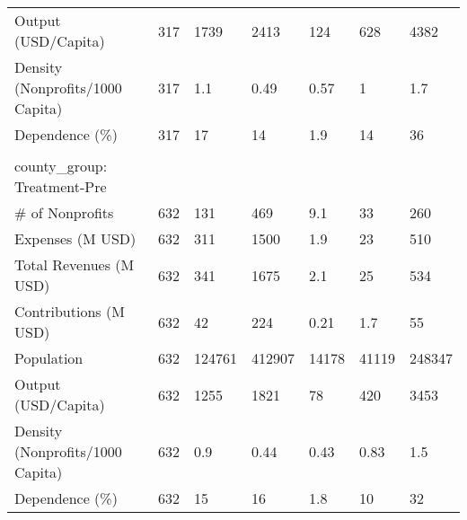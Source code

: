 \begin{tabular}{lllllll}
Output (USD/Capita) & 317 & 1739 & 2413 & 124 & 628 & 4382\\
Density (Nonprofits/1000 Capita) & 317 & 1.1 & 0.49 & 0.57 & 1 & 1.7\\
Dependence (\%) & 317 & 17 & 14 & 1.9 & 14 & 36\\
 &  &  &  &  &  & \\
county_group: Treatment-Pre &  &  &  &  &  & \\
\# of Nonprofits & 632 & 131 & 469 & 9.1 & 33 & 260\\
Expenses (M USD) & 632 & 311 & 1500 & 1.9 & 23 & 510\\
Total Revenues (M USD) & 632 & 341 & 1675 & 2.1 & 25 & 534\\
Contributions (M USD) & 632 & 42 & 224 & 0.21 & 1.7 & 55\\
Population & 632 & 124761 & 412907 & 14178 & 41119 & 248347\\
Output (USD/Capita) & 632 & 1255 & 1821 & 78 & 420 & 3453\\
Density (Nonprofits/1000 Capita) & 632 & 0.9 & 0.44 & 0.43 & 0.83 & 1.5\\
Dependence (\%) & 632 & 15 & 16 & 1.8 & 10 & 32\\
\bottomrule
\end{tabular}
